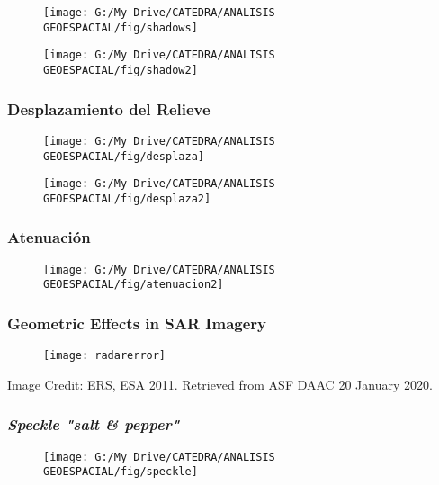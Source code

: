 \documentclass[14pt]{beamer}
\begin{document}
\begin{frame}
 \begin{figure}
    \centering
    \texttt{[image: G:/My Drive/CATEDRA/ANALISIS GEOESPACIAL/fig/shadows]}
  \end{figure}
\end{frame}
\begin{frame}
 \begin{figure}
    \centering
    \texttt{[image: G:/My Drive/CATEDRA/ANALISIS GEOESPACIAL/fig/shadow2]}
  \end{figure}
\end{frame}
\begin{frame}
\frametitle{Desplazamiento del Relieve}
 \begin{figure}
    \centering
    \texttt{[image: G:/My Drive/CATEDRA/ANALISIS GEOESPACIAL/fig/desplaza]}
  \end{figure}
\end{frame}
\begin{frame}
 \begin{figure}
    \centering
    \texttt{[image: G:/My Drive/CATEDRA/ANALISIS GEOESPACIAL/fig/desplaza2]}
  \end{figure}
\end{frame}
\begin{frame}
\frametitle{Atenuación}
 \begin{figure}
    \centering
    \texttt{[image: G:/My Drive/CATEDRA/ANALISIS GEOESPACIAL/fig/atenuacion2]}
  \end{figure}
\end{frame}
\begin{frame}
\frametitle{Geometric Effects in SAR Imagery}
 \begin{figure}
    \centering
    \texttt{[image: radarerror]}
  \end{figure}
\tiny{Image Credit: ERS, ESA 2011. Retrieved from ASF DAAC 20 January 2020.}
\end{frame}
\begin{frame}
\frametitle{\emph{Speckle "\emph{salt \& pepper}"}}
 \begin{figure}
    \centering
    \texttt{[image: G:/My Drive/CATEDRA/ANALISIS GEOESPACIAL/fig/speckle]}
  \end{figure}
\end{frame}
\end{document}
